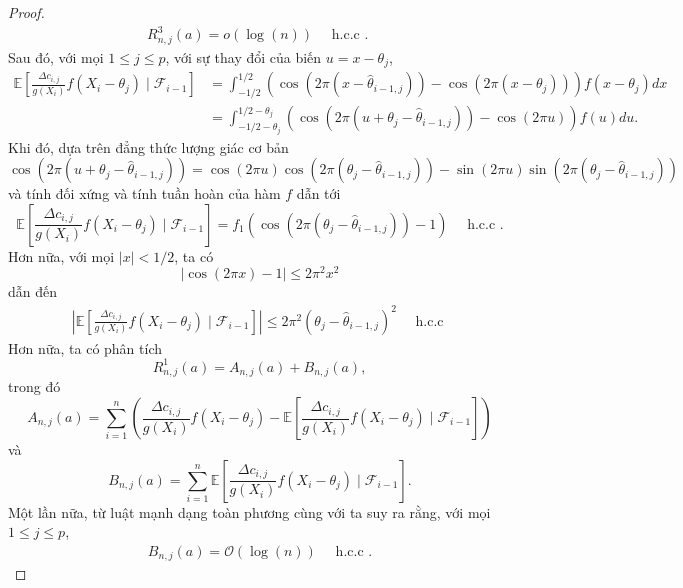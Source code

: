 \begin{proof}
\begin{align}
    R_{n, j}^{3}(a)=o(\log (n)) \quad \text { h.c.c . }
    \label{8.21}
\end{align}
Sau đó, với mọi $1 \leq j \leq p$, với sự thay đổi của biến $u=x-\theta_{j}$,
$$
\begin{aligned}
\mathbb{E}\left[\frac{\Delta c_{i, j}}{g\left(X_{i}\right)} f\left(X_{i}-\theta_{j}\right) \mid \mathcal{F}_{i-1}\right] & =\int_{-1 / 2}^{1 / 2}\left(\cos \left(2 \pi\left(x-\widehat{\theta}_{i-1, j}\right)\right)-\cos \left(2 \pi\left(x-\theta_{j}\right)\right)\right) f\left(x-\theta_{j}\right) d x \\
& =\int_{-1 / 2-\theta_{j}}^{1 / 2-\theta_{j}}\left(\cos \left(2 \pi\left(u+\theta_{j}-\widehat{\theta}_{i-1, j}\right)\right)-\cos (2 \pi u)\right) f(u) d u.
\end{aligned}
$$
Khi đó, dựa trên đẳng thức lượng giác cơ bản
$$
\cos \left(2 \pi\left(u+\theta_{j}-\widehat{\theta}_{i-1, j}\right)\right)=\cos (2 \pi u) \cos \left(2 \pi\left(\theta_{j}-\widehat{\theta}_{i-1, j}\right)\right)-\sin (2 \pi u) \sin \left(2 \pi\left(\theta_{j}-\widehat{\theta}_{i-1, j}\right)\right)
$$
và tính đối xứng và tính tuần hoàn của hàm $f$ dẫn tới
$$
\mathbb{E}\left[\frac{\Delta c_{i, j}}{g\left(X_{i}\right)} f\left(X_{i}-\theta_{j}\right) \mid \mathcal{F}_{i-1}\right]=f_{1}\left(\cos \left(2 \pi\left(\theta_{j}-\widehat{\theta}_{i-1, j}\right)\right)-1\right) \quad \text { h.c.c .}
$$
Hơn nữa, với mọi $|x|<1 / 2$, ta có
$$
|\cos (2 \pi x)-1| \leq 2 \pi^{2} x^{2}
$$
dẫn đến
\begin{align}
    \left|\mathbb{E}\left[\frac{\Delta c_{i, j}}{g\left(X_{i}\right)} f\left(X_{i}-\theta_{j}\right) \mid \mathcal{F}_{i-1}\right]\right| \leq 2 \pi^{2}\left(\theta_{j}-\widehat{\theta}_{i-1, j}\right)^{2} \quad \text { h.c.c }
    \label{8.22}
\end{align}
Hơn nữa, ta có phân tích
$$
R_{n, j}^{1}(a)=A_{n, j}(a)+B_{n, j}(a),
$$
trong đó
$$
A_{n, j}(a)=\sum_{i=1}^{n}\left(\frac{\Delta c_{i, j}}{g\left(X_{i}\right)} f\left(X_{i}-\theta_{j}\right)-\mathbb{E}\left[\frac{\Delta c_{i, j}}{g\left(X_{i}\right)} f\left(X_{i}-\theta_{j}\right) \mid \mathcal{F}_{i-1}\right]\right)
$$
và
$$
B_{n, j}(a)=\sum_{i=1}^{n} \mathbb{E}\left[\frac{\Delta c_{i, j}}{g\left(X_{i}\right)} f\left(X_{i}-\theta_{j}\right) \mid \mathcal{F}_{i-1}\right].
$$
Một lần nữa, từ luật mạnh dạng toàn phương  cùng với  ta suy ra rằng, với mọi $1 \leq j \leq p$,
\begin{align}
    B_{n, j}(a)=\mathcal{O}(\log (n)) \quad \text { h.c.c .}

\end{align}
\end{proof}
